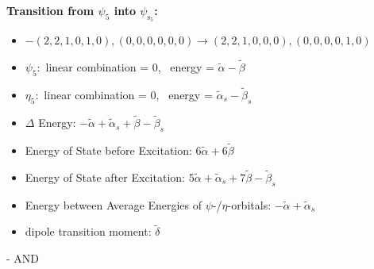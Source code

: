 \documentclass[12pt,a4paper]{article}
\begin{document}
        \noindent\textbf{Transition from $\psi_{5}$ into $\psi_{\text{s}_{5}}$:}
        \begin{itemize}
            \item $- (2, 2, 1, 0, 1, 0), (0, 0, 0, 0, 0, 0) \rightarrow (2, 2, 1, 0, 0, 0), (0, 0, 0, 0, 1, 0)$
        
            \item $\psi_{5}:$ linear combination = $0$, \
            energy = $\tilde{\alpha} - \tilde{\beta}$
            
            \item $\eta_{5}:$ linear combination = $0$, \
            energy = $\tilde{\alpha}_{s} - \tilde{\beta}_{s}$
            
                \item $\Delta$ Energy: $- \tilde{\alpha} + \tilde{\alpha}_{s} + \tilde{\beta} - \tilde{\beta}_{s}$
                \item Energy of State before Excitation: $6 \tilde{\alpha} + 6 \tilde{\beta}$
                \item Energy of State after Excitation: $5 \tilde{\alpha} + \tilde{\alpha}_{s} + 7 \tilde{\beta} - \tilde{\beta}_{s}$
                \item Energy between Average Energies of $\psi$-/$\eta$-orbitals: $- \tilde{\alpha} + \tilde{\alpha}_{s}$
            
            \item dipole transition moment: $\tilde{\delta}$
        
        \end{itemize}
        
 -  AND 
\end{document}
